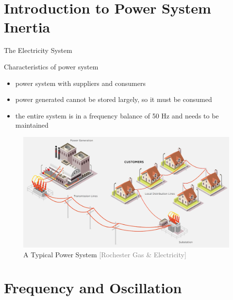 \documentclass{beamer}
\begin{document}
\section{Introduction to Power System Inertia}
\begin{frame}{The Electricity System}
\begin{block}{Characteristics of power system}
\begin{itemize}
\item power system with suppliers and consumers
\item power generated cannot be stored largely, so it must be consumed
\item the entire system is in a frequency balance of 50 Hz and needs to be maintained 
\end{itemize}
\end{block}
\begin{figure}
\includegraphics[scale=0.1]{Figures/PowerSys.png}
 \caption{A Typical Power System \textcolor{gray}{\tiny[Rochester Gas \& Electricity]}}
\end{figure}

\end{frame}
\section{Frequency and Oscillation}
\end{document}
